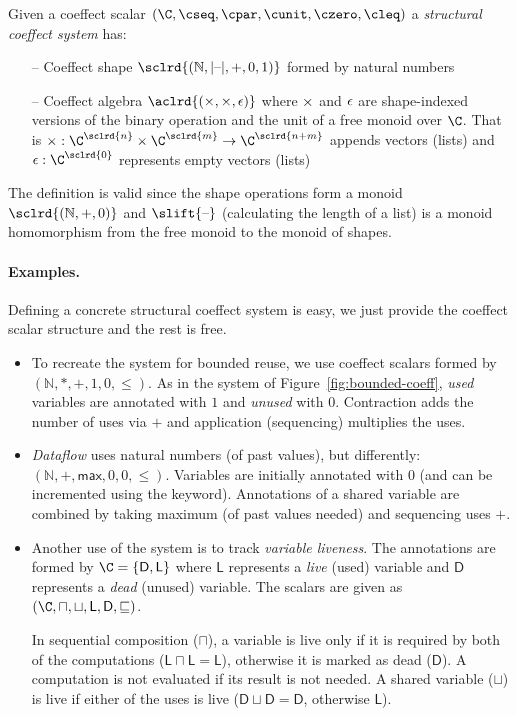\begin{definition}
Given a coeffect scalar $(\C, \cseq, \cpar, \cunit, \czero, \cleq)$ a \emph{structural
coeffect system} has: 
\begin{itemize}{}
\item[--] Coeffect shape $\sclrd{(\mathbb{N}, {|}\textnormal{--}{|}, +, 0, 1)}$ formed by natural numbers
\item[--] Coeffect algebra $\aclrd{(\fcons, \fcons, \fempty)}$ where $\times$ and $\epsilon$ are
  shape-indexed versions of the binary operation and the unit of a free monoid over $\C$.
  That is $\fcons : \C^{\sclrd{n}} \times \C^{\sclrd{m}} \rightarrow \C^{\sclrd{n + m}}$ appends vectors
  (lists) and $\fempty : \C^{\sclrd{0}}$ represents empty vectors (lists)
\end{itemize}
\end{definition}

\noindent
The definition is valid since the shape operations form a monoid
$\sclrd{(\mathbb{N}, +, 0)}$ and $\slift{\textnormal{--}}$ (calculating the length of
a list) is a monoid homomorphism from the free monoid to the monoid of
shapes.

\paragraph{Examples.} 
Defining a concrete structural coeffect system is easy, we just provide the coeffect scalar structure and the rest is free.

\begin{itemize}
\item
To recreate the system for bounded reuse, we use coeffect scalars formed by
$(\mathbb{N}, \ast, +, 1, 0, \leq)$. As in the system of Figure~\ref{fig:bounded-coeff},
\emph{used} variables are annotated with $1$ and \emph{unused} with $0$. Contraction adds the number
of uses via $+$ and application (sequencing) multiplies the uses.

\item
\emph{Dataflow} uses natural numbers (of past values), but differently: $(\mathbb{N}, +, \mathsf{max}, 0, 0, \leq)$.
Variables are initially annotated with $0$ (and can be incremented using the  keyword).
Annotations of a shared variable are combined by taking maximum (of past values needed) and
sequencing uses $+$.

\item
Another use of the system is to track \emph{variable liveness}. The annotations are formed by
$\C=\{ \mathsf{D}, \mathsf{L} \}$ where $\mathsf{L}$ represents a \emph{live} (used) variable
and $\mathsf{D}$ represents a \emph{dead} (unused) variable. The scalars are given as
$(\C, \sqcap, \sqcup, \mathsf{L}, \mathsf{D}, \sqsubseteq)$. 

In sequential composition ($\sqcap$), a variable is live only if it is required by both of the 
computations ($\mathsf{L} \sqcap \mathsf{L} = \mathsf{L}$), otherwise it is marked as 
dead ($\mathsf{D}$). A computation is not evaluated if its result is not needed.
A shared variable ($\sqcup$) is live if either of the uses is live 
($\mathsf{D} \sqcup \mathsf{D} = \mathsf{D}$, otherwise $\mathsf{L}$).
\end{itemize}

